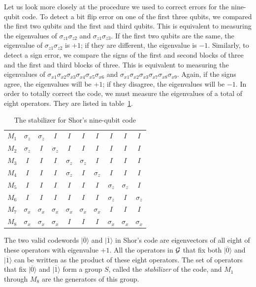 \documentclass{report}
\newcommand{\G}{{\cal G}}
\newcommand{\ket}[1]{|{#1}\rangle}
\newcommand{\X}{\sigma_x}
\newcommand{\Z}{\sigma_z}
\newcommand{\Xs}[1]{\sigma_{x{#1}}}
\newcommand{\Zs}[1]{\sigma_{z{#1}}}
\begin{document}
Let us look more closely at the procedure we used to correct errors for the 
nine-qubit code.  To detect a bit flip error on one of the first three qubits, 
we compared the first two qubits and the first and third qubits.  This is 
equivalent to measuring the eigenvalues of $\Zs{1} \Zs{2}$ and $\Zs{1} \Zs{3}$.
If the first two qubits are the same, the eigenvalue of $\Zs{1} \Zs{2}$ is 
$+1$; if they are different, the eigenvalue is $-1$.  Similarly, to detect a 
sign error, we compare the signs of the first and second blocks of three and 
the first and third blocks of three.  This is equivalent to measuring the 
eigenvalues of $\Xs{1} \Xs{2} \Xs{3} \Xs{4} \Xs{5} \Xs{6}$ and $\Xs{1} \Xs{2}
\Xs{3} \Xs{7} \Xs{8} \Xs{9}$.  Again, if the signs agree, the eigenvalues will 
be $+1$; if they disagree, the eigenvalues will be $-1$.  In order to totally 
correct the code, we must measure the eigenvalues of a total of eight operators.
They are listed in table~\ref{table-9qubit}.
\begin{table}
\centering
\begin{tabular}{c|ccccccccc}
$M_1$ & $\Z$ & $\Z$ & $I$ & $I$ & $I$ & $I$ & $I$ & $I$ & $I$ \\
$M_2$ & $\Z$ & $I$ & $\Z$ & $I$ & $I$ & $I$ & $I$ & $I$ & $I$ \\
$M_3$ & $I$ & $I$ & $I$ & $\Z$ & $\Z$ & $I$ & $I$ & $I$ & $I$ \\
$M_4$ & $I$ & $I$ & $I$ & $\Z$ & $I$ & $\Z$ & $I$ & $I$ & $I$ \\
$M_5$ & $I$ & $I$ & $I$ & $I$ & $I$ & $I$ & $\Z$ & $\Z$ & $I$ \\
$M_6$ & $I$ & $I$ & $I$ & $I$ & $I$ & $I$ & $\Z$ & $I$ & $\Z$ \\
$M_7$ & $\X$ & $\X$ & $\X$ & $\X$ & $\X$ & $\X$ & $I$ & $I$ & $I$ \\
$M_8$ & $\X$ & $\X$ & $\X$ & $I$ & $I$ & $I$ & $\X$ & $\X$ & $\X$
\end{tabular}
\caption{The stabilizer for Shor's nine-qubit code}
\label{table-9qubit}
\end{table}

The two valid codewords $\ket{\overline{0}}$ and $\ket{\overline{1}}$ in 
Shor's code are eigenvectors of all eight of these operators with eigenvalue 
$+1$.  All the operators in $\G$ that fix both $\ket{\overline{0}}$ and 
$\ket{\overline{1}}$ can be written as the product of these eight operators.  
The set of operators that fix $\ket{\overline{0}}$ and $\ket{\overline{1}}$ 
form a group $S$, called the {\em stabilizer} of the code, and $M_1$ 
through $M_8$ are the generators of this group.
\end{document}
